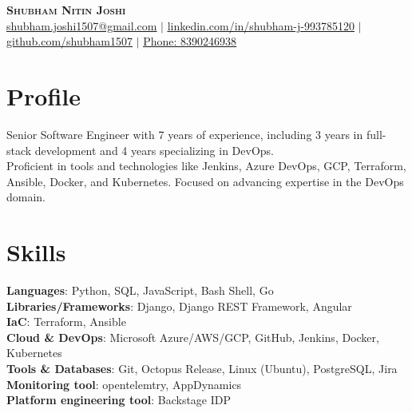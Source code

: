 \documentclass[letterpaper, 11pt]{article}
\begin{document}
\begin{center}
    \textbf{\Huge \scshape Shubham Nitin Joshi} \\
    \href{mailto:shubham.joshi1507@gmail.com}{\underline{shubham.joshi1507@gmail.com}} $|$ 
    \href{https://www.linkedin.com/in/shubham-j-993785120/}{\underline{linkedin.com/in/shubham-j-993785120}} $|$
    \href{https://github.com/shubham1507}{\underline{github.com/shubham1507}} $|$
    \href{tel:8390246938}{\underline{Phone: 8390246938}}
\end{center}

\vspace{-15pt}

\section{Profile}
\small{
    Senior Software Engineer with 7 years of experience, including 3 years in full-stack development and 4 years specializing in DevOps. \\
    Proficient in tools and technologies like Jenkins, Azure DevOps, GCP, Terraform, Ansible, Docker, and Kubernetes. Focused on advancing expertise in the DevOps domain. \\
}

\vspace{-15pt}

\section{Skills}
\begin{itemize}[leftmargin=0.25in, label={}]
    \small{\item{
     \textbf{Languages}{: Python, SQL, JavaScript, Bash Shell, Go} \\
     \textbf{Libraries/Frameworks}{: Django, Django REST Framework, Angular} \\
     \textbf{IaC}{: Terraform, Ansible} \\
     \textbf{Cloud \& DevOps}{: Microsoft Azure/AWS/GCP, GitHub, Jenkins, Docker, Kubernetes} \\
     \textbf{Tools \& Databases}{: Git, Octopus Release, Linux (Ubuntu), PostgreSQL, Jira} \\
     \textbf{Monitoring tool}{: opentelemtry, AppDynamics} \\
     \textbf{Platform engineering tool}{: Backstage IDP } \\
    }}\\
\end{itemize}
\end{document}
